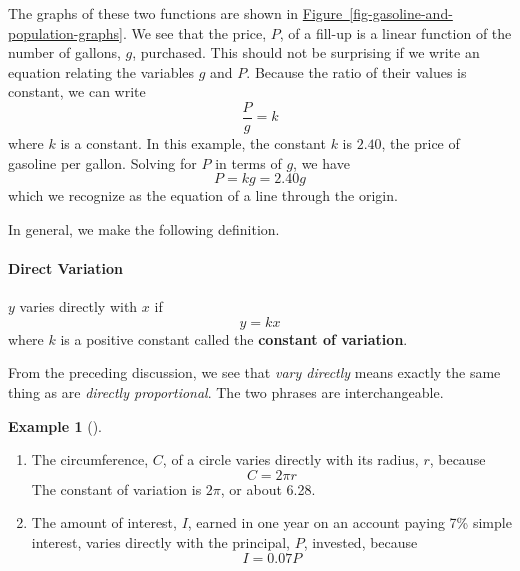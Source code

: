\documentclass[10pt,]{book}
\newcommand{\terminology}[1]{\textbf{#1}}
\theoremstyle{plain}
\theoremstyle{definition}
\theoremstyle{definition}
\theoremstyle{definition}
\newtheorem{example}[theorem]{Example}
\theoremstyle{definition}
\theoremstyle{definition}
\numberwithin{equation}{section}
\begin{document}
	The graphs of these two functions are shown in \hyperref[fig-gasoline-and-population-graphs]{Figure~\ref{fig-gasoline-and-population-graphs}}. We see that the price, \(P\), of a fill-up is a linear function of the number of gallons, \(g\), purchased. This should not be surprising if we write an equation relating the variables \(g\) and \(P\). Because the ratio of their values is constant, we can write
	\begin{equation*}\frac{P}{g}= k\end{equation*}
	where \(k\) is a constant. In this example, the constant \(k\) is \(2.40\), the price of gasoline per gallon. Solving for \(P\) in terms of \(g\), we have
	\begin{equation*}P = kg = 2.40g\end{equation*}
	which we recognize as the equation of a line through the origin.
%
\par

	In general, we make the following definition.
%
\typeout{************************************************}
\typeout{************************************************}
\paragraph[Direct Variation]{Direct Variation}\label{paragraphs-37}
\index{}%
\par

	\(y\) varies directly with \(x\) if
	\begin{equation*}y = kx\end{equation*}
	where \(k\) is a positive constant called the \terminology{constant of variation}.
%
\par

	From the preceding discussion, we see that \emph{vary directly} means exactly the same thing as are \emph{directly proportional}. The two phrases are interchangeable.
%
\begin{example}[]\label{example-circumference-and-simple-interest}
\leavevmode%
\begin{enumerate}[label=*\alph**]
\item\hypertarget{li-394}{}The circumference, \(C\), of a circle varies directly with its radius, \(r\), because 
		\begin{equation*}C = 2\pi r \end{equation*}
		The constant of variation is \(2\pi\), or about 6.28.\item\hypertarget{li-395}{}The amount of interest, \(I\), earned in one year on an account paying 7\% simple interest, varies directly with the principal, \(P\), invested, because 
		\begin{equation*}I = 0.07P\end{equation*}\end{enumerate}
\end{example}
\par
\end{document}
